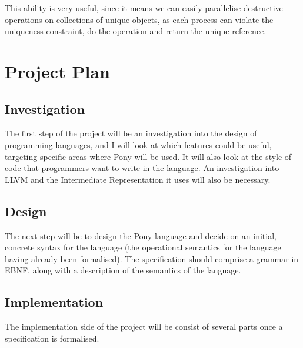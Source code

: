 \documentclass[pdftex,11pt,a4paper]{report}
\begin{document}
This ability is very useful, since it means we can easily parallelise destructive operations on collections of unique objects, as each process can violate the uniqueness constraint, do the operation and return the unique reference.

\newpage
\chapter{Project Plan}

\section{Investigation}
The first step of the project will be an investigation into the design of programming languages, and I will look at which features could be useful, targeting specific areas where Pony will be used.
It will also look at the style of code that programmers want to write in the language.
An investigation into LLVM and the Intermediate Representation it uses will also be necessary.

\section{Design}
The next step will be to design the Pony language and decide on an initial, concrete syntax for the language (the operational semantics for the language having already been formalised).
The specification should comprise a grammar in EBNF, along with a description of the semantics of the language.

\section{Implementation}
The implementation side of the project will be consist of several parts once a specification is formalised.
\end{document}
